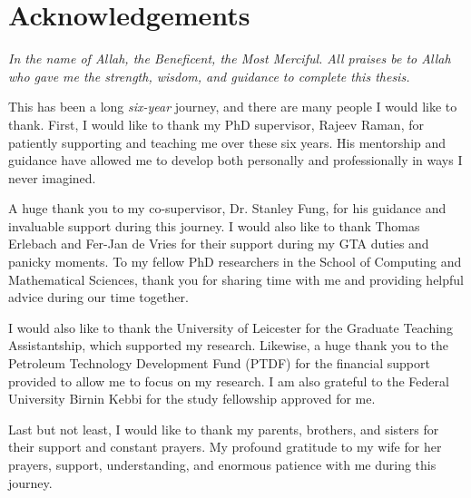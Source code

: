 \chapter*{\Large \center Acknowledgements}
\begin{center}
\textit{In the name of Allah, the Beneficent, the Most Merciful. All praises be to Allah who gave me the strength, wisdom, and guidance to complete this thesis.}
\end{center}
This has been a long \textit{six-year} journey, and there are many people I would like to thank. First, I would like to thank my PhD supervisor, Rajeev Raman, for patiently supporting and teaching me over these six years. His mentorship and guidance have allowed me to develop both personally and professionally in ways I never imagined.

A huge thank you to my co-supervisor, Dr. Stanley Fung, for his guidance and invaluable support during this journey. I would also like to thank Thomas Erlebach and Fer-Jan de Vries for their support during my GTA duties and panicky moments. To my fellow PhD researchers in the School of Computing and Mathematical Sciences, thank you for sharing time with me and providing helpful advice during our time together.

I would also like to thank the University of Leicester for the Graduate Teaching Assistantship, which supported my research. Likewise, a huge thank you to the Petroleum Technology Development Fund (PTDF) for the financial support provided to allow me to focus on my research. I am also grateful to the Federal University Birnin Kebbi for the study fellowship approved for me.

Last but not least, I would like to thank my parents, brothers, and sisters for their support and constant prayers. My profound gratitude to my wife for her prayers, support, understanding, and enormous patience with me during this journey.